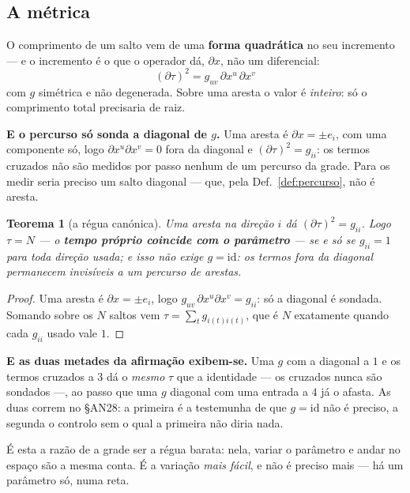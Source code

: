 \documentclass[11pt,a4paper]{article}
\newtheorem{teorema}{Teorema}
\begin{document}
\subsection*{A métrica}

\noindent O comprimento de um salto vem de uma \textbf{forma quadrática} no seu
incremento --- e o incremento é o que o operador dá, $\partial x$, não um
diferencial:
\[
\boxed{\;(\partial\tau)^{2}=g_{uv}\,\partial x^{u}\,\partial x^{v}\;}
\]
com $g$ simétrica e não degenerada. Sobre uma aresta o valor é \emph{inteiro}:
só o comprimento total precisaria de raiz.

\medskip\noindent\textbf{E o percurso só sonda a diagonal de $g$.} Uma aresta é
$\partial x=\pm e_i$, com uma componente só, logo $\partial x^{u}\partial x^{v}=0$ fora
da diagonal e $(\partial\tau)^{2}=g_{ii}$: os termos cruzados não são medidos por passo nenhum de um
percurso da grade. Para os medir seria preciso um salto diagonal --- que, pela
Def.~\ref{def:percurso}, não é aresta.

\begin{teorema}[a régua canónica]\label{thm:gcanon}
Uma aresta na direção $i$ dá $(\partial\tau)^{2}=g_{ii}$. Logo $\tau=N$ --- o
\textbf{tempo próprio coincide com o parâmetro} --- se e só se $g_{ii}=1$ para
toda direção usada; e isso \emph{não} exige $g=\mathrm{id}$: os termos fora da
diagonal permanecem invisíveis a um percurso de arestas.
\end{teorema}

\begin{proof}
Uma aresta é $\partial x=\pm e_i$, logo
$g_{uv}\,\partial x^{u}\partial x^{v}=g_{ii}$: só a diagonal é sondada. Somando
sobre os $N$ saltos vem $\tau=\sum_t g_{i(t)i(t)}$, que é $N$ exatamente quando
cada $g_{ii}$ usado vale $1$.
\end{proof}

\medskip\noindent\textbf{E as duas metades da afirmação exibem-se.} Uma $g$ com
a diagonal a $1$ e os termos cruzados a $3$ dá o \emph{mesmo} $\tau$ que a
identidade --- os cruzados nunca são sondados ---, ao passo que uma $g$ diagonal
com uma entrada a $4$ já o afasta. As duas correm no §AN28: a primeira é a
testemunha de que $g=\mathrm{id}$ não é preciso, a segunda o controlo sem o qual
a primeira não diria nada.

\medskip\noindent É esta a razão de a grade ser a régua barata: nela, variar o
parâmetro e andar no espaço são a mesma conta. É a variação \emph{mais fácil},
e não é preciso mais --- há um parâmetro só, numa reta.
\end{document}
